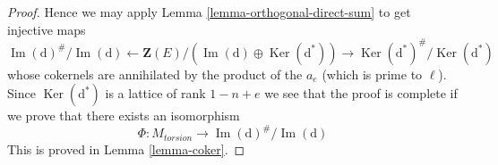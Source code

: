 \documentclass[10pt,a4paper]{amsart}
\theoremstyle{plain}
\theoremstyle{definition}
\theoremstyle{remark}
\numberwithin{equation}{subsection}
\def\Ker{\mathop{\mathrm{Ker}}}
\def\Im{\mathop{\mathrm{Im}}}
\begin{document}
\begin{proof}
\medskip\noindent
Hence we may apply Lemma \ref{lemma-orthogonal-direct-sum}
to get injective maps
$$
\Im(\text{d})^\#/\Im(\text{d}) \leftarrow
\mathbf{Z}(E)/(\Im(\text{d}) \oplus \Ker(\text{d}^*)) \rightarrow
\Ker(\text{d}^*)^\#/\Ker(\text{d}^*)
$$
whose cokernels are annihilated by the product of the $a_e$
(which is prime to $\ell$). Since $\Ker(\text{d}^*)$ is
a lattice of rank $1 - n + e$ we see that the proof is complete
if we prove that there exists an isomorphism
$$
\Phi : M_{torsion} \longrightarrow \Im(\text{d})^\#/\Im(\text{d})
$$
This is proved in Lemma \ref{lemma-coker}.
\end{proof}
\end{document}
